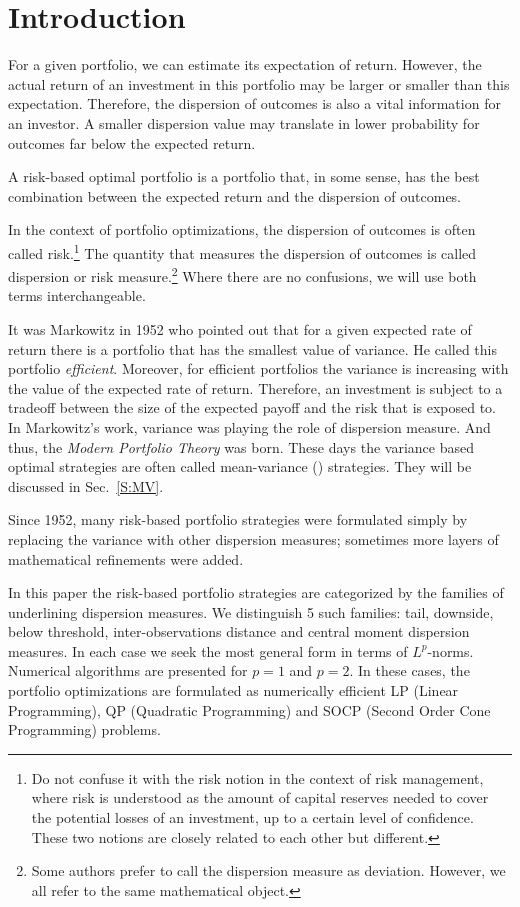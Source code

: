 \section{Introduction}

For a given portfolio, we can estimate its expectation of return. However, the actual return of an investment in this portfolio may be larger or smaller than this expectation.
Therefore, the dispersion of outcomes is also a vital information for an investor.
A smaller dispersion value may translate in lower probability for outcomes far below the expected return.

A risk-based optimal portfolio is a portfolio that, in some sense, has the best combination between the expected return and the dispersion of outcomes.

In the context of portfolio optimizations, the dispersion of outcomes is often called risk.\footnote{Do not confuse it with the risk
notion in the context of risk management, where risk is understood as the amount of capital reserves needed to cover the potential losses of an investment,
up to a certain level of confidence. These two notions are closely related to each other but different.}
The quantity that measures the dispersion of outcomes is called dispersion or risk measure.\footnote{Some authors prefer to call
the dispersion measure as deviation. However, we all refer to the same mathematical object.}
Where there are no confusions, we will use both terms interchangeable.

It was Markowitz in 1952 \cite{Markowitz} who pointed out that for a given expected rate of return
there is a portfolio that has the smallest value of variance.
He called this portfolio {\it efficient}. Moreover, for efficient portfolios the variance
is increasing with the value of the expected rate of return.
Therefore, an investment is subject to a tradeoff between the size of the expected payoff and the risk that is exposed to.
In Markowitz's work, variance was playing the role of
dispersion measure. And thus, the {\it Modern Portfolio Theory} was born. These days the variance based optimal strategies
are often called mean-variance (\MV) strategies. They will be discussed in Sec.~\ref{S:MV}.

Since 1952, many risk-based portfolio strategies were formulated simply by replacing the variance with other
dispersion measures; sometimes more layers of mathematical refinements were added.

In this paper the risk-based portfolio strategies are categorized by the families of underlining dispersion measures.
We distinguish 5 such families: tail, downside, below threshold, inter-observations distance and central moment dispersion measures.
In each case we seek the most general form in terms of $L^p$-norms.
Numerical algorithms are presented for $p=1$ and $p=2$. In these cases, the portfolio optimizations are
formulated as numerically efficient LP (Linear Programming), QP (Quadratic Programming)
and SOCP (Second Order Cone Programming) problems.


